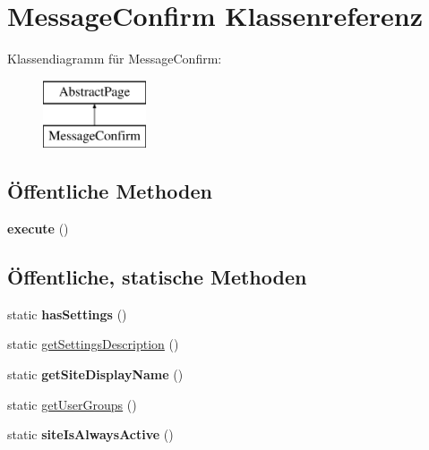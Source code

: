 \hypertarget{class_message_confirm}{}\section{Message\+Confirm Klassenreferenz}
\label{class_message_confirm}
Klassendiagramm für Message\+Confirm\+:\begin{figure}[H]
\begin{center}
\leavevmode
\includegraphics[height=2.000000cm]{class_message_confirm}
\end{center}
\end{figure}
\subsection*{Öffentliche Methoden}
\begin{DoxyCompactItemize}
\item 
\mbox{\label{class_message_confirm_aef10cc75b997298d800beaf0fc1d5fc8}} 
{\bfseries execute} ()
\end{DoxyCompactItemize}
\subsection*{Öffentliche, statische Methoden}
\begin{DoxyCompactItemize}
\item 
\mbox{\label{class_message_confirm_a30d0fbd88932b5eac00e6f414df48e95}} 
static {\bfseries has\+Settings} ()
\item 
static \mbox{\hyperlink{class_message_confirm_a9f5b5365855d0d6fec570fd7e5e03bfc}{get\+Settings\+Description}} ()
\item 
\mbox{\label{class_message_confirm_a7a613f75fdfea12d71e36a6c529dbdfc}} 
static {\bfseries get\+Site\+Display\+Name} ()
\item 
static \mbox{\hyperlink{class_message_confirm_a3db19c53b0fc9883eec64167f636ad13}{get\+User\+Groups}} ()
\item 
\mbox{\label{class_message_confirm_ab62d85b137e39822f8c6d0ec97ebd527}} 
static {\bfseries site\+Is\+Always\+Active} ()
\end{DoxyCompactItemize}

